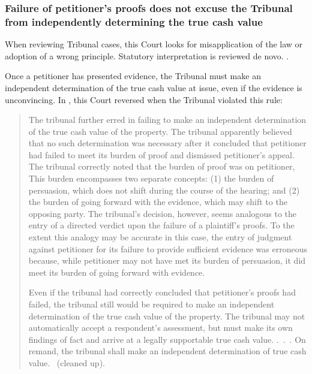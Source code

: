 \documentclass[12pt,\documentclassflag]{michiganCourtOfAppealsBrief}
\begin{document}

\subsubsection{Failure of petitioner's proofs does not excuse the Tribunal from independently determining the true cash value}

When reviewing Tribunal cases, this Court looks for misapplication of the law or adoption of a wrong principle. Statutory interpretation is reviewed de novo. . 

Once a petitioner has presented evidence, the Tribunal must make an independent determination of the true cash value at issue, even if the evidence is unconvincing. In \cite{Jones & Laughlin}, this Court reversed when the Tribunal violated this rule:

\begin{quotation}
The tribunal further erred in failing to make an independent determination of the true cash value of the property. The tribunal apparently believed that no such determination was necessary after it concluded that petitioner had failed to meet its burden of proof and dismissed petitioner's appeal. The tribunal correctly noted that the burden of proof was on petitioner, This burden encompasses two separate concepts: (1) the burden of persuasion, which does not shift during the course of the hearing; and (2) the burden of going forward with the evidence, which may shift to the opposing party. The tribunal's decision, however, seems analogous to the entry of a directed verdict upon the failure of a plaintiff's proofs. To the extent this analogy may be accurate in this case, the entry of judgment against petitioner for its failure to provide sufficient evidence was erroneous because, while petitioner may not have met its burden of persuasion, it did meet its burden of going forward with evidence.
	
	Even if the tribunal had correctly concluded that petitioner's proofs had failed, the tribunal still would be required to make an independent determination of the true cash value of the property. The tribunal may not automatically accept a respondent's assessment, but must make its own findings of fact and arrive at a legally supportable true cash value. .~.~. On remand, the tribunal shall make an independent determination of true cash value. \ (cleaned up).
\end{quotation}
\end{document}
